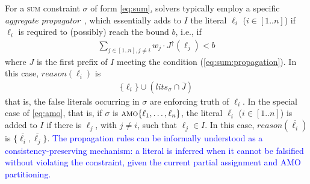 \documentclass[preprint,authoryear]{elsarticle}
\theoremstyle{definition}
\begin{document}
For a \textsc{sum} constraint $\sigma$ of form \eqref{eq:sum}, solvers typically employ a specific \textit{aggregate propagator}~\citep{DBLP:conf/iclp/GebserKKS09,DBLP:journals/fuin/FaberLMR11},
which essentially adds to $I$ the literal $\ell_i$ ($i \in [1..n]$) if $\ell_i$ is required to (possibly) reach the bound $b$, i.e., if
\begin{align}\label{eq:sum:propagation}
    \sum_{j \in [1..n], j \neq i}{w_j \cdot J^\uparrow(\ell_j)} < b
\end{align}
where $J$ is the first prefix of $I$ meeting the condition (\ref{eq:sum:propagation}).
In this case, $\mathit{reason}(\ell_i)$ is 
\begin{align}
\label{eq:sum:reason}
    \{\ell_i\} \cup (\mathit{lits}_\sigma \cap \overline{J})
\end{align} that is, the false literals occurring in $\sigma$ are enforcing truth of $\ell_i$.
%
In the special case of \eqref{eq:amo}, that is, if $\sigma$ is $\textsc{amo}\{\ell_1, \ldots, \ell_n\}$, the literal $\overline{\ell_i}$ ($i \in [1..n]$) is added to $I$ if there is $\ell_j$, with $j \neq i$, such that $\ell_j \in I$.
In this case, $\mathit{reason}(\overline{\ell_i})$ is $\{\overline{\ell_i}, \overline{\ell_j}\}$.
%
\textcolor{blue}{The propagation rules can be informally understood as a consistency-preserving mechanism: a literal is inferred when it cannot be falsified without violating the constraint, given the current partial assignment and AMO partitioning.}
\end{document}
